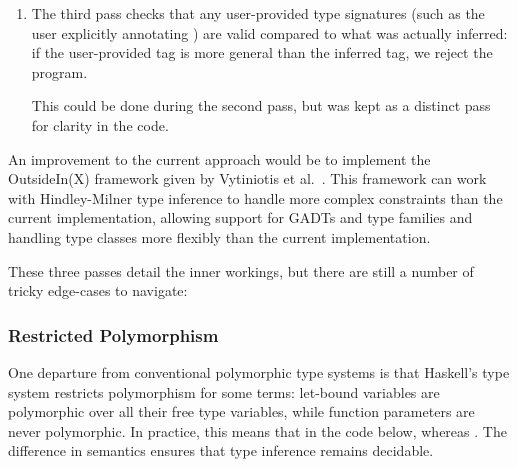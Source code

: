\documentclass[dissertation.tex]{subfiles}
\begin{document}
{{\begin{enumerate}
{            This cannot be done efficiently during the first pass: consider the expression  where the \(t_i\) are type variables tagging the expressions. Assume we have inferred that  and \haskell{(+) :: #\(\beta\rightarrow\beta\rightarrow\beta\)#} as described above, and that we have unified \(t_1\) and \(t_2\) with these types respectively. Inferring the type of the overall expression would proceed by unifying the type of the first formal argument of the function (\(\beta\)) with the first actual argument (\(\alpha\)), and then using this substitution to type the return value of the function as \(\alpha\rightarrow\alpha\rightarrow\alpha\), which we can now unify with \(t_3\). Had we previously updated the subterm's tags to be their inferred concrete types we would now have to update them again: \(\beta\) is no longer used as it was unified with \(\alpha\), but our subterms may still contains uses of it.
        }
        \item
        {
            The third pass checks that any user-provided type signatures (such as the user explicitly annotating ) are valid compared to what was actually inferred: if the user-provided tag is more general than the inferred tag, we reject the program. 

            This could be done during the second pass, but was kept as a distinct pass for clarity in the code.
        }
        \end{enumerate}

        An improvement to the current approach would be to implement the OutsideIn(X) framework given by Vytiniotis et al.\ \cite{OutsideIn}. This framework can work with Hindley-Milner type inference to handle more complex constraints than the current implementation, allowing support for GADTs and type families and handling type classes more flexibly than the current implementation.

        These three passes detail the inner workings, but there are still a number of tricky edge-cases to navigate:

        \subsubsection*{Restricted Polymorphism}
        {
            One departure from conventional polymorphic type systems is that Haskell's type system restricts polymorphism for some terms: let-bound variables are polymorphic over all their free type variables, while function parameters are never polymorphic. In practice, this means that in the code below,  whereas . The difference in semantics ensures that type inference remains decidable. 

}}}
\end{document}
